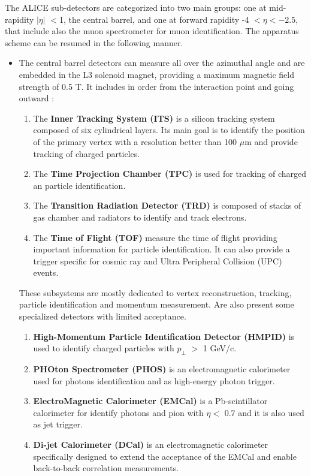 \documentclass[12pt,a4paper]{book}
\begin{document}
	The ALICE sub-detectors are categorized into two main groups: one at mid-rapidity $|\eta|$ $<$1, the central barrel, and one at forward rapidity -4 $< \eta < -2.5$, that include also the muon spectrometer for muon identification. The apparatus scheme can be resumed in the following manner.
	\begin{itemize}
		\item The central barrel detectors can measure all over the azimuthal angle and are embedded in the L3 solenoid magnet, providing a maximum magnetic field strength of 0.5 T. It includes in order from the interaction point and going outward 
		\cite{Padhan:2924203} \cite{Arata:2922803}:
		\begin{enumerate}
			\item The \textbf{Inner Tracking System (ITS)} is a silicon tracking system composed of six cylindrical layers. Its main goal is to identify the	position of the primary vertex with a resolution better than 100 $\mu$m and provide tracking of charged particles.
			\item The \textbf{ Time Projection Chamber (TPC)} is used for tracking of charged an particle identification.
			\item The \textbf{Transition Radiation Detector (TRD)} is composed of stacks of gas chamber and radiators to identify and track electrons.
			\item The \textbf{Time of Flight (TOF)} measure the time of flight providing important information for particle identification. It can also provide a trigger specific for cosmic ray and Ultra Peripheral Collision (UPC) events.
		\end{enumerate}
		These subsystems are mostly dedicated to vertex reconstruction, tracking, particle identification and momentum measurement. Are also present some specialized detectors with limited acceptance. 
		\begin{enumerate}
			\item \textbf{High-Momentum Particle Identification Detector (HMPID)} is used to identify charged particles with $p_\perp$ $>$ 1 GeV/c.
			\item \textbf{PHOton Spectrometer (PHOS)} is an electromagnetic calorimeter used for photons identification and as high-energy photon trigger.
			\item \textbf{ElectroMagnetic Calorimeter (EMCal)} is a Pb-scintillator calorimeter for identify photons and pion with $\eta <$ 0.7 and it is also used as jet trigger.
			\item  \textbf{Di-jet Calorimeter (DCal)} is an electromagnetic calorimeter  specifically designed to extend the acceptance of the EMCal and enable back-to-back correlation measurements.

\end{enumerate}
\end{itemize}
\end{document}
